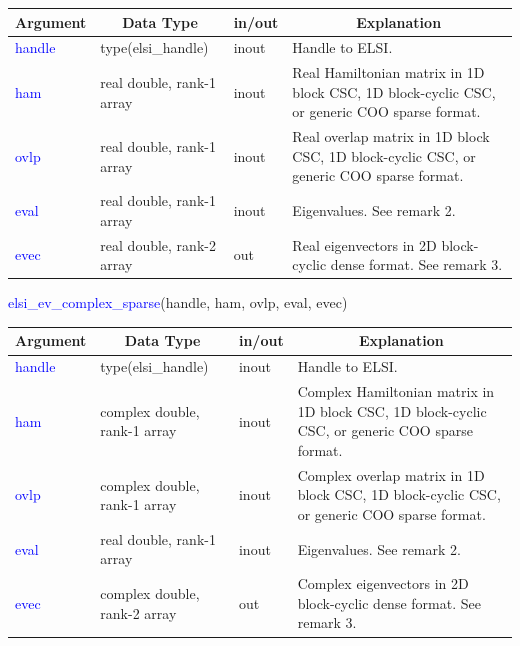 \documentclass{report}
\begin{document}
\begin{table}[h]
\centering
\begin{tabular}[]{|p{20mm}|p{45mm}|p{15mm}|p{85mm}|}
\hline
\multicolumn{1}{|c|}{\textbf{Argument}} & \multicolumn{1}{c|}{\textbf{Data Type}} & \multicolumn{1}{c|}{\textbf{in/out}} & \multicolumn{1}{c|}{\textbf{Explanation}}\\
\hline
\textcolor{blue}{handle} & type(elsi\_handle)        & inout & Handle to ELSI.\\
\hline
\textcolor{blue}{ham}    & real double, rank-1 array & inout & Real Hamiltonian matrix in 1D block CSC, 1D block-cyclic CSC, or generic COO sparse format.\\
\hline
\textcolor{blue}{ovlp}   & real double, rank-1 array & inout & Real overlap matrix in 1D block CSC, 1D block-cyclic CSC, or generic COO sparse format.\\
\hline
\textcolor{blue}{eval}   & real double, rank-1 array & inout & Eigenvalues. See remark 2.\\
\hline
\textcolor{blue}{evec}   & real double, rank-2 array & out   & Real eigenvectors in 2D block-cyclic dense format. See remark 3.\\
\hline
\end{tabular}
\end{table}

\begin{labeling}{\hspace{6cm}}
\item [\hspace{0.3cm} \textcolor{blue}{elsi\_ev\_complex\_sparse}(handle, ham, ovlp, eval, evec)]
\end{labeling}

\begin{table}[h]
\centering
\begin{tabular}[]{|p{20mm}|p{45mm}|p{15mm}|p{85mm}|}
\hline
\multicolumn{1}{|c|}{\textbf{Argument}} & \multicolumn{1}{c|}{\textbf{Data Type}} & \multicolumn{1}{c|}{\textbf{in/out}} & \multicolumn{1}{c|}{\textbf{Explanation}}\\
\hline
\textcolor{blue}{handle} & type(elsi\_handle)           & inout & Handle to ELSI.\\
\hline
\textcolor{blue}{ham}    & complex double, rank-1 array & inout & Complex Hamiltonian matrix in 1D block CSC, 1D block-cyclic CSC, or generic COO sparse format.\\
\hline
\textcolor{blue}{ovlp}   & complex double, rank-1 array & inout & Complex overlap matrix in 1D block CSC, 1D block-cyclic CSC, or generic COO sparse format.\\
\hline
\textcolor{blue}{eval}   & real double, rank-1 array    & inout & Eigenvalues. See remark 2.\\
\hline
\textcolor{blue}{evec}   & complex double, rank-2 array & out   & Complex eigenvectors in 2D block-cyclic dense format. See remark 3.\\
\hline
\end{tabular}
\end{table}
\end{document}
